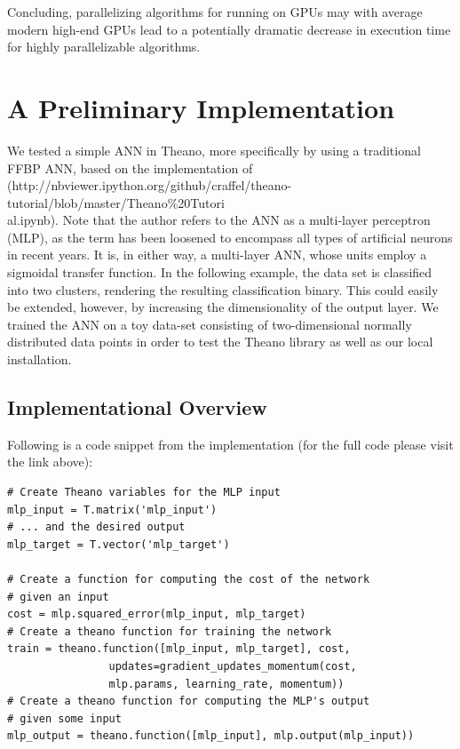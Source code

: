 Concluding, parallelizing algorithms for running on GPUs may with average modern high-end GPUs lead to a potentially dramatic decrease in execution time for highly parallelizable algorithms.

\section{A Preliminary Implementation}

We tested a simple ANN in Theano, more specifically by using a traditional FFBP ANN, based on the implementation of
\\(http://nbviewer.ipython.org/github/craffel/theano-tutorial/blob/master/Theano\%20Tutori
\\al.ipynb). Note that the author refers to the ANN as a multi-layer perceptron (MLP), as the term has been loosened to encompass all types of artificial neurons in recent years. It is, in either way, a multi-layer ANN, whose units employ a sigmoidal transfer function. In the following example, the data set is classified into two clusters, rendering the resulting classification binary. This could easily be extended, however, by increasing the dimensionality of the output layer. We trained the ANN on a toy data-set consisting of two-dimensional normally distributed data points in order to test the Theano library as well as our local installation.


\subsection{Implementational Overview}

Following is a code snippet from the implementation (for the full code please visit the link above):

\begin{verbatim}
# Create Theano variables for the MLP input
mlp_input = T.matrix('mlp_input')
# ... and the desired output
mlp_target = T.vector('mlp_target')

# Create a function for computing the cost of the network 
# given an input
cost = mlp.squared_error(mlp_input, mlp_target)
# Create a theano function for training the network
train = theano.function([mlp_input, mlp_target], cost,
                updates=gradient_updates_momentum(cost,
                mlp.params, learning_rate, momentum))
# Create a theano function for computing the MLP's output 
# given some input
mlp_output = theano.function([mlp_input], mlp.output(mlp_input))
\end{verbatim}


